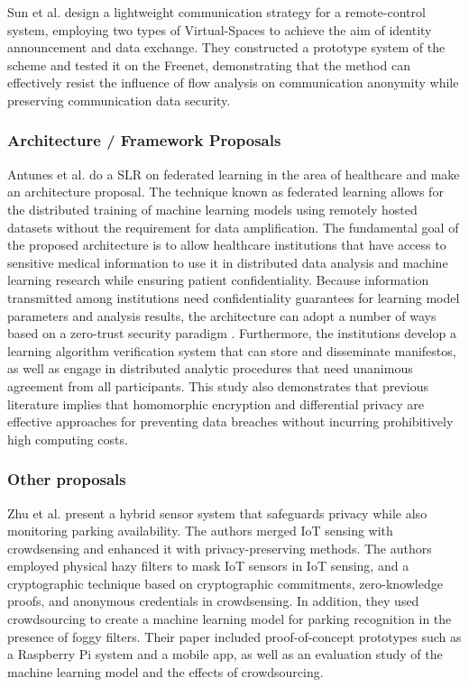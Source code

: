 \documentclass[manuscript,natbib=false]{acmart}
\begin{document}
Sun et al. \cite{SunSecure} design a lightweight communication strategy
for a remote-control system, employing two types of Virtual-Spaces to achieve
the aim of identity announcement and data exchange. They constructed a prototype
system of the scheme and tested it on the Freenet, demonstrating that the
method can effectively resist the influence of flow analysis on communication
anonymity while preserving communication data security.

\subsubsection{Architecture / Framework Proposals}

Antunes et al. \cite{AntunesFederated} do a SLR on federated learning in
the area of healthcare and make an architecture proposal. The technique
known as federated learning allows for the distributed training of machine
learning models using remotely hosted datasets without the requirement for
data amplification. The fundamental goal of the proposed architecture is
to allow healthcare institutions that have access to sensitive medical information
to use it in distributed data analysis and machine learning research while
ensuring patient confidentiality. Because information transmitted among
institutions need confidentiality guarantees for learning model parameters
and analysis results, the architecture can adopt a number of ways based on
a zero-trust security paradigm \cite{ChenSecurity}. Furthermore, the institutions
develop a learning algorithm verification system that can store and disseminate
manifestos, as well as engage in distributed analytic procedures that need
unanimous agreement from all participants. This study also demonstrates
that previous literature implies that homomorphic encryption and differential
privacy are effective approaches for preventing data breaches without incurring
prohibitively high computing costs.

\subsubsection{Other proposals}

Zhu et al. \cite{ZhuIntegrating} present a hybrid sensor system that safeguards
privacy while also monitoring parking availability. The authors merged IoT
sensing with crowdsensing and enhanced it with privacy-preserving methods.
The authors employed physical hazy filters to mask IoT sensors in IoT sensing,
and a cryptographic technique based on cryptographic commitments, zero-knowledge
proofs, and anonymous credentials in crowdsensing. In addition, they used
crowdsourcing to create a machine learning model for parking recognition
in the presence of foggy filters. Their paper included proof-of-concept
prototypes such as a Raspberry Pi system and a mobile app, as well as an
evaluation study of the machine learning model and the effects of crowdsourcing.
\end{document}
